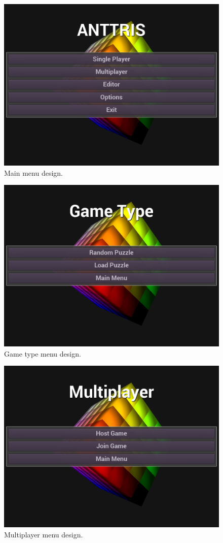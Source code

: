 \documentclass[12pt]{article}
\begin{document}
    \begin{figure}[H]
        \centering
        \includegraphics[width=4.5in]{Anttris_MainMenu.png}
        \caption{Main menu design.}
    \end{figure}
    \begin{figure}[H]
        \centering
        \includegraphics[width=4.5in]{Anttris_GTMenu.png}
        \caption{Game type menu design.}
    \end{figure}
    \begin{figure}[H]
        \centering
        \includegraphics[width=4.5in]{Anttris_MPMenu.png}
        \caption{Multiplayer menu design.}
    \end{figure}
\end{document}
